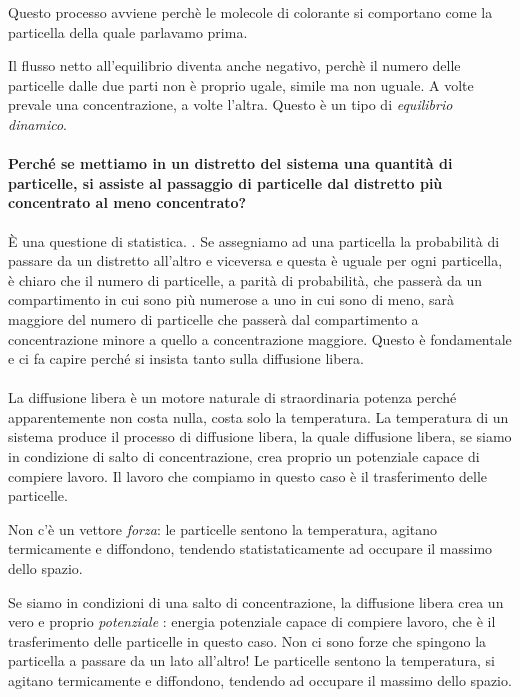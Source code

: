 \documentclass[a4paper,12pt]{article}
\begin{document}
Questo processo avviene perchè le molecole di colorante si comportano come la particella della quale parlavamo prima.

Il flusso netto all'equilibrio diventa anche negativo, perchè il numero delle particelle dalle due parti non è proprio ugale, simile ma non uguale. A volte prevale una concentrazione, a volte l'altra. Questo è un tipo di \emph{equilibrio dinamico}.


\paragraph{Perché se mettiamo in un distretto del sistema una quantità di particelle, si assiste al passaggio di particelle dal distretto più concentrato al meno concentrato?}
È una questione di statistica. . Se assegniamo ad una particella la probabilità di passare da un distretto all'altro e viceversa e questa è uguale per ogni particella, è chiaro che il numero di particelle, a parità di probabilità, che passerà da un compartimento in cui sono più numerose a uno in cui sono di meno, sarà maggiore del numero di particelle che passerà dal compartimento a concentrazione minore a quello a concentrazione maggiore. Questo è fondamentale e ci fa capire perché si insista tanto sulla diffusione libera.

\paragraph{}
La diffusione libera è un motore naturale di straordinaria potenza perché apparentemente non costa nulla, costa solo la temperatura. La temperatura di un sistema produce il processo di diffusione libera, la quale diffusione libera, se siamo in condizione di salto di concentrazione, crea proprio un potenziale capace di compiere lavoro. Il lavoro che compiamo in questo caso è il trasferimento delle particelle.

Non c'è un vettore \emph{forza}: le particelle sentono la temperatura, agitano termicamente e diffondono, tendendo statistaticamente ad occupare il massimo dello spazio.

Se siamo in condizioni di una salto di concentrazione, la diffusione libera crea un vero e proprio \emph{potenziale} : energia potenziale capace di compiere lavoro, che è il trasferimento delle particelle in questo caso.
Non ci sono forze che spingono la particella a passare da un lato all'altro! Le particelle sentono la temperatura, si agitano termicamente e diffondono, tendendo ad occupare il massimo dello spazio.
\end{document}
